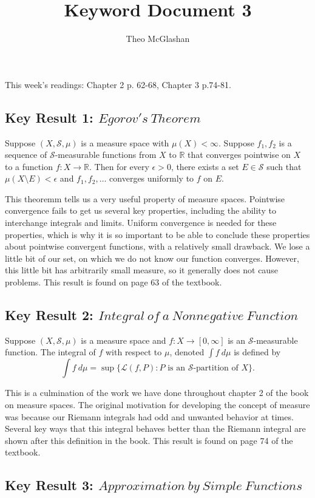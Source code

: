 \documentclass[12pt]{article}
\title{Keyword Document 3}
\author{Theo McGlashan}
\date{}
\def\R{\mathbb{R}}
\begin{document}
This week's readings: Chapter 2 p. 62-68, Chapter 3 p.74-81.

\subsection*{Key Result 1: $Egorov's~Theorem$}

Suppose $(X, \mathcal{S}, \mu)$ is a measure space with $\mu(X) < \infty$. Suppose $f_1, f_2$ is a sequence of $\mathcal{S}$-measurable functions from $X$ to $\R$ that converges pointwise on $X$ to a function $f : X \to \R$. Then for every $\epsilon > 0$, there exists a set $E \in \mathcal{S}$ such that $\mu(X \setminus E) < \epsilon$ and $f_1, f_2, \ldots$ converges uniformly to $f$ on $E$.

This theoremm tells us a very useful property of measure spaces. Pointwise convergence fails to get us several key properties, including the ability to interchange integrals and limits. Uniform convergence is needed for these properties, which is why it is so important to be able to conclude these properties about pointwise convergent functions, with a relatively small drawback. We lose a little bit of our set, on which we do not know our function converges. However, this little bit has arbitrarily small measure, so it generally does not cause problems. This result is found on page 63 of the textbook.

\subsection*{Key Result 2: $Integral~of~a~Nonnegative~Function$}

Suppose $(X, \mathcal{S}, \mu)$ is a measure space and $f : X \to [0, \infty]$ is an $\mathcal{S}$-measurable function. The integral of $f$ with respect to $\mu$, denoted $\int f~d \mu$ is defined by $$\int f~d\mu = \sup \{ \mathcal{L}(f, P) : P \text{ is an } \mathcal{S} \text{-partition of } X\}.$$

This is a culmination of the work we have done throughout chapter 2 of the book on measure spaces. The original motivation for developing the concept of measure was because our Riemann integrals had odd and unwanted behavior at times. Several key ways that this integral behaves better than the Riemann integral are shown after this definition in the book. This result is found on page 74 of the textbook.

\subsection*{Key Result 3: $Approximation~by~Simple~Functions$}
\end{document}
